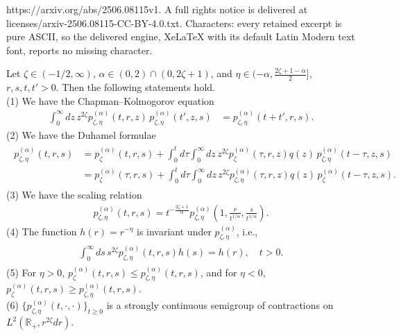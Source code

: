 \documentclass[10pt,a4paper]{amsart}
\newcommand{\R}{\mathbb{R}}
\begin{document}
https://arxiv.org/abs/2506.08115v1. A full rights notice is delivered at licenses/arxiv-2506.08115-CC-BY-4.0.txt. Characters: every retained excerpt is pure ASCII, so the delivered engine, XeLaTeX with its default Latin Modern text font, reports no missing character.
\begin{theorem}
  \label{propertiesschrodheatkernel}
  Let $\zeta\in(-1/2,\infty)$, $\alpha\in(0,2)\cap(0,2\zeta+1)$, and $\eta\in(-\alpha,\frac{2\zeta+1-\alpha}{2}]$, $r,s,t,t'>0$. Then the following statements hold.\\
  \textup{(1)}
  We have the Chapman--Kolmogorov equation
  \begin{align}
    \int_0^\infty dz\, z^{2\zeta} p_{\zeta,\eta}^{(\alpha)}(t,r,z) \, p_{\zeta,\eta}^{(\alpha)}(t',z,s)
    & = p_{\zeta,\eta}^{(\alpha)}(t+t',r,s).
  \end{align}
  \textup{(2)}
  We have the Duhamel formulae
  \begin{align}
    \label{eq:duhamelclassictransformed}
    \begin{split}
      p_{\zeta,\eta}^{(\alpha)}(t,r,s)
      & = p_\zeta^{(\alpha)}(t,r,s) + \int_0^t d\tau \int_0^\infty dz\, z^{2\zeta} p_\zeta^{(\alpha)}(\tau,r,z) q(z)\, p_{\zeta,\eta}^{(\alpha)}(t-\tau,z,s) \\
      & = p_\zeta^{(\alpha)}(\tau,r,s) + \int_0^t d\tau \int_0^\infty dz\, z^{2\zeta} p_{\zeta,\eta}^{(\alpha)}(\tau,r,z) q(z)\, p_\zeta^{(\alpha)}(t-\tau,z,s).
    \end{split}
  \end{align}
  \textup{(3)}
  We have the scaling relation
  \begin{align}
    \label{eq:scalingalphahardy}
    p_{\zeta,\eta}^{(\alpha)}(t,r,s)
    = t^{-\frac{2\zeta+1}{\alpha}} p_{\zeta,\eta}^{(\alpha)}\left(1,\frac{r}{t^{1/\alpha}},\frac{s}{t^{1/\alpha}}\right).
  \end{align}
  \textup{(4)}
  The function $h(r)=r^{-\eta}$ is invariant under $p_{\zeta,\eta}^{(\alpha)}$, i.e.,
  \begin{align}
    \label{eq:supermediantransformedalphaintro}
    \begin{split}
      \int_0^\infty ds\, s^{2\zeta} p_{\zeta,\eta}^{(\alpha)}(t,r,s) h(s) = h(r), \quad t>0.
    \end{split}
  \end{align}
  \textup{(5)}
  For $\eta>0$, $p_\zeta^{(\alpha)}(t,r,s)\leq p_{\zeta,\eta}^{(\alpha)}(t,r,s)$, and for $\eta<0$, $p_\zeta^{(\alpha)}(t,r,s)\geq p_{\zeta,\eta}^{(\alpha)}(t,r,s)$.
  \\
  \textup{(6)}
  $\{p_{\zeta,\eta}^{(\alpha)}(t,\cdot,\cdot)\}_{t\geq0}$ is a strongly continuous semigroup of contractions on $L^2(\R_+,r^{2\zeta}dr)$.
\end{theorem}
\end{document}
